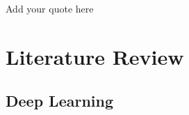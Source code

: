 \begin{savequote}[75mm]
Add your quote here
\end{savequote}

\chapter{Literature Review}
\label{literature}

\clearpage







\section{Deep Learning}







